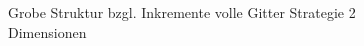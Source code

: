 \documentclass[a4paper,12pt]{llncs}
\numberwithin{equation}{section}
\begin{document}
\begin{figure}
	\caption{Grobe Struktur bzgl. Inkremente volle Gitter Strategie 2 Dimensionen}
	\label{fig:fullGrid01}
\end{figure}
\end{document}
